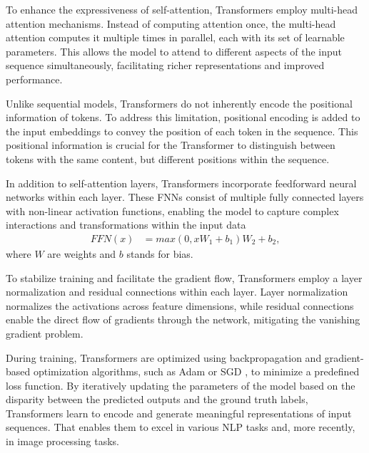 To enhance the expressiveness of self-attention, Transformers employ multi-head attention mechanisms. Instead of
computing attention once, the multi-head attention computes it multiple times in parallel, each with its set of
learnable parameters. This allows the model to attend to different aspects of the input sequence simultaneously, facilitating richer representations and improved performance.

Unlike sequential models, Transformers do not inherently encode the positional information of tokens. To address this
limitation, positional encoding is added to the input embeddings to convey the position of each token in the sequence. This positional information is crucial for the Transformer to distinguish between tokens with the same content, but different positions within the sequence.

In addition to self-attention layers, Transformers incorporate feedforward neural networks within each layer. These FNNs consist of multiple fully connected layers with non-linear activation functions, enabling the model to capture complex interactions and transformations within the input data
\begin{align}
  FFN(x) &= max(0, xW_1 + b_1)W_2 + b_2,
\end{align}
where $W$ are weights and $b$ stands for bias.

To stabilize training and facilitate the gradient flow, Transformers employ a layer normalization and residual
connections
within each layer. Layer normalization normalizes the activations across feature dimensions, while residual connections enable the direct flow of gradients through the network, mitigating the vanishing gradient problem.

During training, Transformers are optimized using backpropagation and gradient-based optimization algorithms, such as
Adam \cite{kingma2017adam} or SGD \cite{rakhlin2012making}, to minimize a predefined loss function. By iteratively updating the
parameters of the model based on
the disparity between the predicted outputs and the ground truth labels, Transformers learn to encode and generate
meaningful representations of input sequences. That enables them to excel in various NLP tasks and, more recently, in
image processing tasks.




